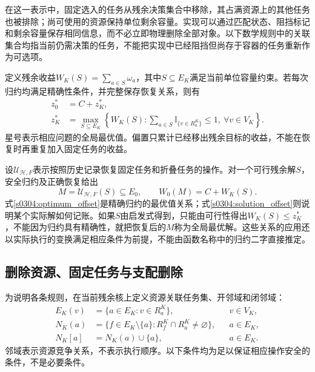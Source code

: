 在这一表示中，固定选入的任务从残余决策集合中移除，其占满资源上的其他任务也被排除；尚可使用的资源保持单位剩余容量。实现可以通过匹配状态、阻挡标记和剩余容量保存相同信息，而不必立即物理删除全部对象。以下数学规则中的关联集合均指当前仍需决策的任务，不能把实现中已经阻挡但尚存于容器的任务重新作为可选项。

定义残余收益$W_K(S)=\sum_{a\in S}\omega_a$，其中$S\subseteq E_K$满足当前单位容量约束。若每次归约均满足精确性条件，并完整保存恢复关系，则有
\begin{equation}
 \begin{aligned}
 z_0^*&=C+z_K^*,\\
 z_K^*&=\max_{S\subseteq E_K}
 \left\{W_K(S):
 \sum_{a\in S}\mathbb{I}_{\{v\in R_a^K\}}\leq1,
 \ \forall v\in V_K\right\}.
 \end{aligned}
 \label{s0304:optimum_offset}
\end{equation}
星号表示相应问题的全局最优值。偏置只累计已经移出残余目标的收益，不能在恢复时再重复加入固定任务的收益。

设$\mathcal{U}_{\mathcal{H},F}$表示按照历史记录恢复固定任务和折叠任务的操作。对一个可行残余解$S$，安全归约及正确恢复给出
\begin{equation}
 M=\mathcal{U}_{\mathcal{H},F}(S)\subseteq E_0,
 \qquad W_0(M)=C+W_K(S).
 \label{s0304:solution_offset}
\end{equation}
式\eqref{s0304:optimum_offset}是精确归约的最优值关系；式\eqref{s0304:solution_offset}则说明某个实际解如何记账。如果$S$由启发式得到，只能由可行性得出$W_K(S)\leq z_K^*$，不能因为归约具有精确性，就把恢复后的$M$称为全局最优解。这些关系的应用还以实际执行的变换满足相应条件为前提，不能由函数名称中的归约二字直接推定。

\subsection{删除资源、固定任务与支配删除}

为说明各条规则，在当前残余核上定义资源关联任务集、开邻域和闭邻域：
\begin{align}
 E_K(v)&=\{a\in E_K:v\in R_a^K\}, &&v\in V_K,
 \label{s0304:incident}\\
 N_K(a)&=\{f\in E_K\setminus\{a\}:R_f^K\cap R_a^K\ne\varnothing\},
 &&a\in E_K,
 \label{s0304:open_neighborhood}\\
 N_K[a]&=N_K(a)\cup\{a\}, &&a\in E_K.
 \label{s0304:closed_neighborhood}
\end{align}
邻域表示资源竞争关系，不表示执行顺序。以下条件均为足以保证相应操作安全的条件，不是必要条件。

